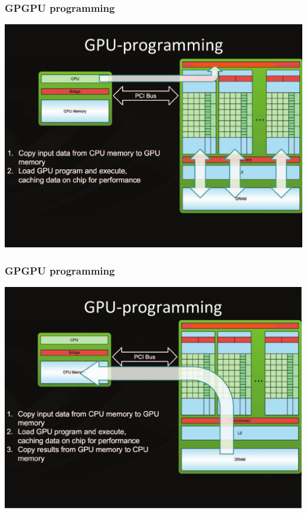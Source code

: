 \documentclass{beamer}
\begin{document}
\begin{frame}[fragile,t]
\frametitle{GPGPU programming}

\begin{center}
\includegraphics[height=43ex]{Figures/Lab1/MemCpy2.pdf}
\end  {center}

\end{frame}


\begin{frame}[fragile,t]
\frametitle{GPGPU programming}

\begin{center}
\includegraphics[height=43ex]{Figures/Lab1/MemCpy3.pdf}
\end  {center}

\end{frame}
\end{document}
